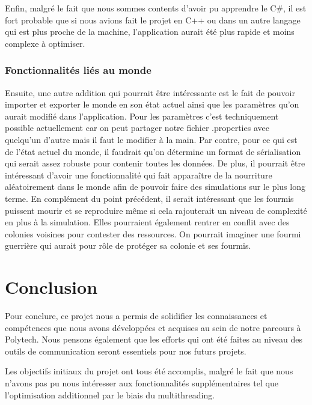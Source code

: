 \documentclass{EPUProjetDi}
\begin{document}
Enfin, malgré le fait que nous sommes contents d'avoir pu apprendre le C\#, il est fort probable que si nous avions fait le projet en C++ 
ou dans un autre langage qui est plus proche de la machine, l'application aurait été plus rapide et moins complexe à optimiser.


\subsection{Fonctionnalités liés au monde}
Ensuite, une autre addition qui pourrait être intéressante est le fait de pouvoir importer et exporter le monde en son état actuel ainsi que les paramètres qu'on aurait modifié dans l'application.
Pour les paramètres c'est techniquement possible actuellement car on peut partager notre fichier .properties avec quelqu'un d'autre mais il faut le modifier à la main. 
Par contre, pour ce qui est de l'état actuel du monde, il faudrait qu'on détermine un format de sérialisation qui serait assez robuste pour contenir toutes les données.
De plus, il pourrait être intéressant d'avoir une fonctionnalité qui fait apparaître de la nourriture aléatoirement dans le monde afin de pouvoir faire des simulations sur le plus long terme.
En complément du point précédent, il serait intéressant que les fourmis puissent mourir et se reproduire même si cela rajouterait un niveau de complexité en plus à la simulation. 
Elles pourraient également rentrer en conflit avec des colonies voisines pour contester des ressources. On pourrait imaginer une fourmi guerrière qui aurait pour rôle de protéger sa colonie et ses fourmis.

\chapter*{Conclusion}

Pour conclure, ce projet nous a permis de solidifier les connaissances et compétences que nous avons développées et acquises au sein de notre parcours à Polytech.
Nous pensons également que les efforts qui ont été faites au niveau des outils de communication seront essentiels pour nos futurs projets.

Les objectifs initiaux du projet ont tous été accomplis, malgré le fait que nous n'avons pas pu nous intéresser aux fonctionnalités supplémentaires tel que l'optimisation additionnel par le biais du multithreading.
\end{document}
